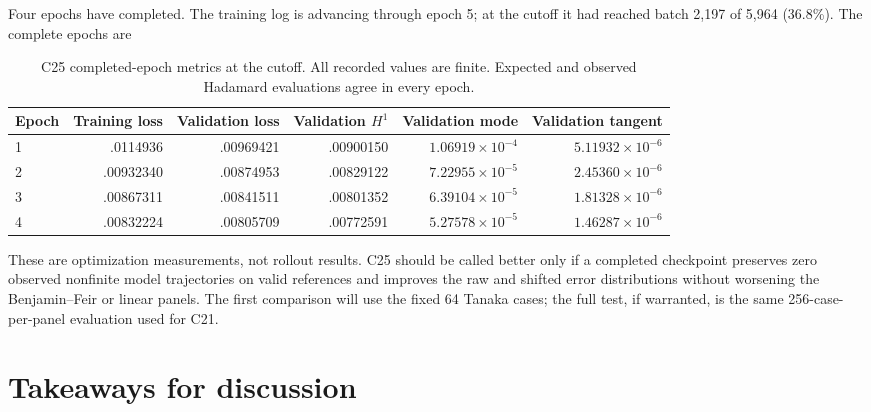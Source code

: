 \documentclass[11pt]{article}
\begin{document}
Four epochs have completed.  The training log is advancing through epoch 5;
at the cutoff it had reached batch 2,197 of 5,964 (36.8\%).  The complete epochs are
\begin{table}[H]
\centering
\small
\begin{tabular}{lrrrrr}
\toprule
Epoch & Training loss & Validation loss & Validation $H^1$ & Validation mode & Validation tangent \\
\midrule
1 & .0114936 & .00969421 & .00900150 & $1.06919\times10^{-4}$ & $5.11932\times10^{-6}$ \\
2 & .00932340 & .00874953 & .00829122 & $7.22955\times10^{-5}$ & $2.45360\times10^{-6}$ \\
3 & .00867311 & .00841511 & .00801352 & $6.39104\times10^{-5}$ & $1.81328\times10^{-6}$ \\
4 & .00832224 & .00805709 & .00772591 & $5.27578\times10^{-5}$ & $1.46287\times10^{-6}$ \\
\bottomrule
\end{tabular}
\caption{C25 completed-epoch metrics at the cutoff.  All recorded values are
finite.  Expected and observed Hadamard evaluations agree in every epoch.}
\label{tab:c25-progress}
\end{table}

These are optimization measurements, not rollout results.  C25 should be
called better only if a completed checkpoint preserves zero observed
nonfinite model trajectories on valid references and improves the raw and
shifted error distributions without worsening the Benjamin--Feir or linear
panels.  The first comparison will use the fixed 64 Tanaka cases; the full
test, if warranted, is the same 256-case-per-panel evaluation used for C21.

\section{Takeaways for discussion}
\end{document}
